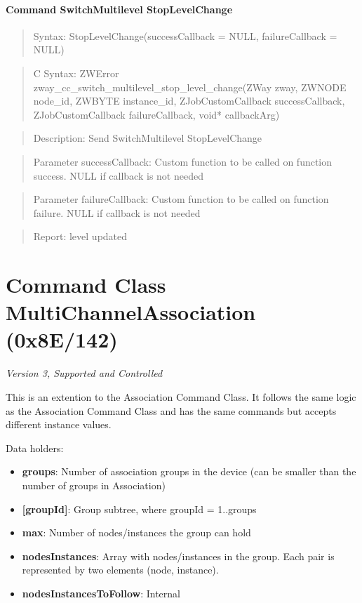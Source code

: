 \paragraph{Command SwitchMultilevel StopLevelChange}
\begin{quote}Syntax: StopLevelChange(successCallback = NULL, failureCallback = NULL)\end{quote}
\begin{quote}C Syntax: ZWError zway\_cc\_switch\_multilevel\_stop\_level\_change(ZWay zway, ZWNODE node\_id, ZWBYTE instance\_id, ZJobCustomCallback successCallback, ZJobCustomCallback failureCallback, void* callbackArg)\end{quote}
\begin{quote}Description: Send SwitchMultilevel StopLevelChange\end{quote}
\begin{quote}Parameter successCallback: Custom function to be called on function success. NULL if callback is not needed\end{quote}
\begin{quote}Parameter failureCallback: Custom function to be called on function failure. NULL if callback is not needed\end{quote}
\begin{quote}Report: level updated\end{quote}


\section{Command Class MultiChannelAssociation (0x8E/142)}

\textit{Version 3, Supported and Controlled}
\newline

This is an extention to the Association Command Class. It follows the same logic as the Association Command Class and has the same commands but accepts different instance values.
\newline

\noindent
Data holders:

\begin{itemize}
\item \textbf{groups}: Number of association groups in the device (can be smaller than the number of groups in Association)
\item \textbf{[groupId]}: Group subtree, where groupId = 1..groups
\item \qquad\textbf{max}: Number of nodes/instances the group can hold
\item \qquad\textbf{nodesInstances}: Array with nodes/instances in the group. Each pair is represented by two elements (node, instance).
\item \qquad\textbf{nodesInstancesToFollow}: Internal
\end{itemize}

